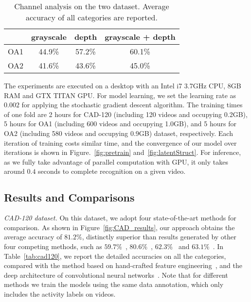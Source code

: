 \documentclass{sig-alternate}
\begin{document}
\begin{table}[!hbp]
\center
\begin{tabular}{|c|c|c|c|}
\hline
  & grayscale & depth & grayscale + depth \\
\hline
OA1 & 44.9\% & 57.2\% & 60.1\% \\
OA2 & 41.6\% & 43.6\% & 45.0\% \\  
\hline
\end{tabular}
\caption{ Channel analysis on the two dataset. Average accuracy of all categories are reported.}
\label{tab:channel}
\end{table}

The experiments are executed on a desktop with an Intel i7 3.7GHz CPU, 8GB RAM and GTX TITAN GPU. For model learning, we set the learning rate as $0.002$ for applying the stochastic gradient descent algorithm. The training times of one fold are 2 hours for CAD-120 (including 120 videos and occupying 0.2GB), 5 hours for OA1 (including 600 videos and occupying 1.0GB), and 5 hours for OA2 (including 580 videos and occupying 0.9GB) dataset, respectively. Each iteration of training costs similar time, and the convergence of our model over iterations is shown in Figure.~\ref{fig:pretrain} and~\ref{fig:latentStruct}. For inference, as we fully take advantage of parallel computation with GPU, it only takes around $0.4$ seconds to complete recognition on a given video.



\subsection{Results and Comparisons}

\emph{CAD-120 dataset.} On this dataset, we adopt four state-of-the-art methods for comparison. As shown in Figure~\ref{fig:CAD_results}, our approach obtains the average accuracy of $81.2\%$, distinctly superior than results generated by other four competing methods, such as $59.7\%$~\cite{SungICRA2012}, $80.6\%$~\cite{CADIJRR2013}, $62.3\%$~\cite{DSTIP} and $63.1\%$~\cite{3DCNNPAMI}. In Table~\ref{tab:cad120}, we report the detailed accuracies on all the categories, compared with the method based on hand-crafted feature engineering~\cite{DSTIP}, and the deep architecture of convolutional neural networks~\cite{3DCNNPAMI}. Note that for different methods we train the models using the same data annotation, which only includes the activity labels on videos.
\end{document}
